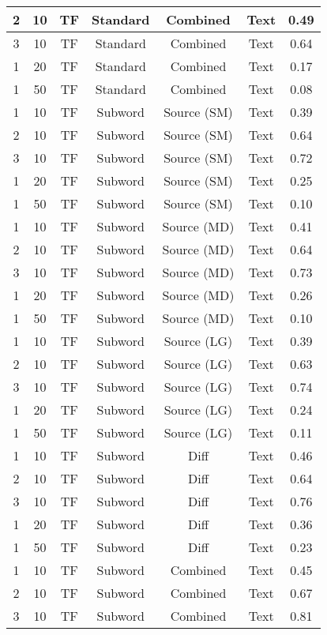 \begin{longtable}{|c|c|c|c|c|c|c|}
\hline
2 & 10 & TF & Standard & Combined & Text & 0.49 \\
\hline
3 & 10 & TF & Standard & Combined & Text & 0.64 \\
\hline
1 & 20 & TF & Standard & Combined & Text & 0.17 \\
\hline
1 & 50 & TF & Standard & Combined & Text & 0.08 \\
\hline
1 & 10 & TF & Subword & Source (SM) & Text & 0.39 \\
\hline
2 & 10 & TF & Subword & Source (SM) & Text & 0.64 \\
\hline
3 & 10 & TF & Subword & Source (SM) & Text & 0.72 \\
\hline
1 & 20 & TF & Subword & Source (SM) & Text & 0.25 \\
\hline
1 & 50 & TF & Subword & Source (SM) & Text & 0.10 \\
\hline
1 & 10 & TF & Subword & Source (MD) & Text & 0.41 \\
\hline
2 & 10 & TF & Subword & Source (MD) & Text & 0.64 \\
\hline
3 & 10 & TF & Subword & Source (MD) & Text & 0.73 \\
\hline
1 & 20 & TF & Subword & Source (MD) & Text & 0.26 \\
\hline
1 & 50 & TF & Subword & Source (MD) & Text & 0.10 \\
\hline
1 & 10 & TF & Subword & Source (LG) & Text & 0.39 \\
\hline
2 & 10 & TF & Subword & Source (LG) & Text & 0.63 \\
\hline
3 & 10 & TF & Subword & Source (LG) & Text & 0.74 \\
\hline
1 & 20 & TF & Subword & Source (LG) & Text & 0.24 \\
\hline
1 & 50 & TF & Subword & Source (LG) & Text & 0.11 \\
\hline
1 & 10 & TF & Subword & Diff & Text & 0.46 \\
\hline
2 & 10 & TF & Subword & Diff & Text & 0.64 \\
\hline
3 & 10 & TF & Subword & Diff & Text & 0.76 \\
\hline
1 & 20 & TF & Subword & Diff & Text & 0.36 \\
\hline
1 & 50 & TF & Subword & Diff & Text & 0.23 \\
\hline
1 & 10 & TF & Subword & Combined & Text & 0.45 \\
\hline
2 & 10 & TF & Subword & Combined & Text & 0.67 \\
\hline
3 & 10 & TF & Subword & Combined & Text & 0.81 \\

\end{longtable}
